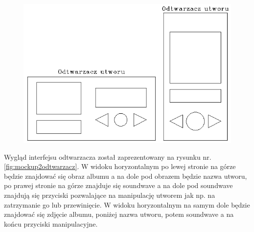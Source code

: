 \begin{figure}[H]
	\centering
	\includegraphics[width=1\linewidth]{images/mockup3_odtwarzacz}
	\caption{}
	\label{fig:mockup3odtwarzacz}
\end{figure}

Wygląd interfejsu odtwarzacza został zaprezentowany na rysunku nr.\ref{fig:mockup2odtwarzacz}. W widoku horyzontalnym po lewej stronie na górze będzie znajdować się obraz albumu a na dole pod obrazem będzie nazwa utworu, po prawej stronie na górze znajduje się soundwave a na dole pod soundwave znajdują się przyciski pozwalające na manipulację utworem jak np. na zatrzymanie go lub przewinięcie. W widoku horyzontalnym na samym dole będzie znajdować się zdjęcie albumu, poniżej nazwa utworu, potem soundwave a na końcu przyciski manipulacyjne.

